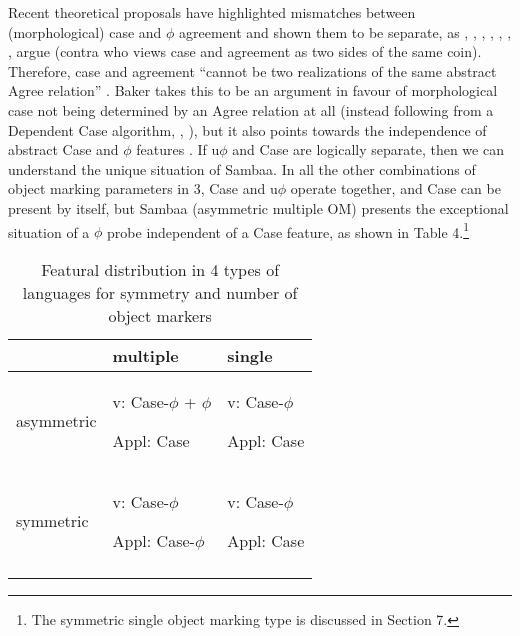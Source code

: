 \documentclass[output=paper
,modfonts
,nonflat]{langsci/langscibook}
\begin{document}
\begin{figure}[!h]
\begin{exe}
\end{exe}
\end{figure} \newpage \noindent
Recent theoretical proposals have highlighted mismatches between (morphological) case and $\phi$ agreement and shown them to be separate, as \citet{Bhatt2005}, \citet{Baker2008a},  \citet{Baker2008b}, \citet{Baker2012}, \citet{Baker2015}, \citet{Bobaljik2008}, \citet{Bárány2015}, \citet{Stegovec2015}
argue (contra \citealt{Chomsky2000, Chomsky2001} who views case and agreement as two sides of the same coin). Therefore, case and agreement “cannot be two realizations of the same abstract Agree relation” \citep[272 on Amharic]{Baker2012}. Baker takes this to be an argument in favour of morphological case not being determined by an Agree relation at all (instead following from a Dependent Case algorithm, \citealt{Marantz1991}, \citealt{Baker2015}), but it also points towards the independence of abstract Case and $\phi$ features \citep{Keine2010, Bárány2015}. If u$\phi$ and Case are logically separate, then we can understand the unique situation of Sambaa. In all the other combinations of object marking parameters in 3, Case and u$\phi$ operate together, and Case can be present by itself, but Sambaa (asymmetric multiple OM) presents the exceptional situation of a $\phi$ probe independent of a Case feature, as shown in Table 4.\footnote{The symmetric single object marking type is discussed in Section 7.}
\begin{table}
\label{Table 4}
\caption{Featural distribution in 4 types of languages for symmetry and number of object markers} 
	\begin{tabularx}{\textwidth}{XXX} 
	\lsptoprule	
		& multiple & single\\
	\midrule
		asymmetric & v:       Case-$\phi$ + $\phi$ 
		
		Appl: Case & { v:       Case-$\phi$} 
		
		Appl: Case\\ 
	\midrule
		symmetric & { v:       Case-$\phi$} 
		
		Appl: Case-$\phi$ & { v: Case-$\phi$} 
		
		Appl: Case\\
	\lspbottomrule		
	\end{tabularx}
\end{table} \newpage \noindent
\end{document}
